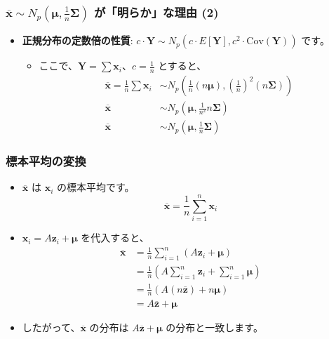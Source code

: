 \documentclass[aspectratio=169]{beamer}
\begin{document}
\begin{frame}
\frametitle{$\overline{\bm{x}}\sim N_{p}(\bm{\mu},\frac{1}{n}\bm{\Sigma})$ が「明らか」な理由 (2)}
\begin{itemize}
    \item \textbf{正規分布の定数倍の性質}: $c\cdot\bm{Y}\sim N_{p}(c\cdot E[\bm{Y}],c^2\cdot\text{Cov}(\bm{Y}))$ です。
    \begin{itemize}
        \item ここで、$\bm{Y}=\sum\bm{x}_i$、$c=\frac{1}{n}$ とすると、
        \begin{align*}
        \overline{\bm{x}}=\frac{1}{n}\sum\bm{x}_i&\sim N_{p}\left(\frac{1}{n}(n\bm{\mu}),\left(\frac{1}{n}\right)^2(n\bm{\Sigma})\right) \\
        \overline{\bm{x}}&\sim N_{p}\left(\bm{\mu},\frac{1}{n^2}n\bm{\Sigma}\right) \\
        \overline{\bm{x}}&\sim N_{p}\left(\bm{\mu},\frac{1}{n}\bm{\Sigma}\right)
        \end{align*}
    \end{itemize}
\end{itemize}
\end{frame}

\begin{frame}
\frametitle{標本平均の変換}
\begin{itemize}
    \item $\overline{\bm{x}}$ は $\bm{x}_i$ の標本平均です。
    \[
    \overline{\bm{x}} = \frac{1}{n}\sum_{i=1}^{n}\bm{x}_i
    \]
    \item $\bm{x}_i = A\bm{z}_i + \bm{\mu}$ を代入すると、
    \begin{align*}
        \overline{\bm{x}} &= \frac{1}{n}\sum_{i=1}^{n}(A\bm{z}_i + \bm{\mu}) \\
        &= \frac{1}{n}\left(A\sum_{i=1}^{n}\bm{z}_i + \sum_{i=1}^{n}\bm{\mu}\right) \\
        &= \frac{1}{n}\left(A(n\overline{\bm{z}}) + n\bm{\mu}\right) \\
        &= A\overline{\bm{z}} + \bm{\mu}
    \end{align*}
    \item したがって、$\overline{\bm{x}}$ の分布は $A\overline{\bm{z}} + \bm{\mu}$ の分布と一致します。
\end{itemize}
\end{frame}
\end{document}
